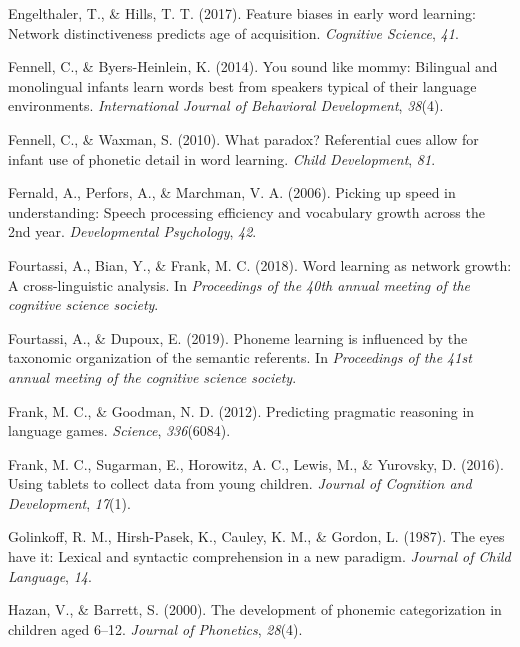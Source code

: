 \documentclass[english,,man]{apa6}
\begin{document}
\leavevmode\hypertarget{ref-engelthaler2017}{}%
Engelthaler, T., \& Hills, T. T. (2017). Feature biases in early word learning: Network distinctiveness predicts age of acquisition. \emph{Cognitive Science}, \emph{41}.

\leavevmode\hypertarget{ref-Fennell2014}{}%
Fennell, C., \& Byers-Heinlein, K. (2014). You sound like mommy: Bilingual and monolingual infants learn words best from speakers typical of their language environments. \emph{International Journal of Behavioral Development}, \emph{38}(4).

\leavevmode\hypertarget{ref-fennell2010}{}%
Fennell, C., \& Waxman, S. (2010). What paradox? Referential cues allow for infant use of phonetic detail in word learning. \emph{Child Development}, \emph{81}.

\leavevmode\hypertarget{ref-fernald2006}{}%
Fernald, A., Perfors, A., \& Marchman, V. A. (2006). Picking up speed in understanding: Speech processing efficiency and vocabulary growth across the 2nd year. \emph{Developmental Psychology}, \emph{42}.

\leavevmode\hypertarget{ref-fourtassi2018}{}%
Fourtassi, A., Bian, Y., \& Frank, M. C. (2018). Word learning as network growth: A cross-linguistic analysis. In \emph{Proceedings of the 40th annual meeting of the cognitive science society}.

\leavevmode\hypertarget{ref-fourtassi2019}{}%
Fourtassi, A., \& Dupoux, E. (2019). Phoneme learning is influenced by the taxonomic organization of the semantic referents. In \emph{Proceedings of the 41st annual meeting of the cognitive science society}.

\leavevmode\hypertarget{ref-frank2012}{}%
Frank, M. C., \& Goodman, N. D. (2012). Predicting pragmatic reasoning in language games. \emph{Science}, \emph{336}(6084).

\leavevmode\hypertarget{ref-frank2016}{}%
Frank, M. C., Sugarman, E., Horowitz, A. C., Lewis, M., \& Yurovsky, D. (2016). Using tablets to collect data from young children. \emph{Journal of Cognition and Development}, \emph{17}(1).

\leavevmode\hypertarget{ref-golinkoff1987}{}%
Golinkoff, R. M., Hirsh-Pasek, K., Cauley, K. M., \& Gordon, L. (1987). The eyes have it: Lexical and syntactic comprehension in a new paradigm. \emph{Journal of Child Language}, \emph{14}.

\leavevmode\hypertarget{ref-hazan2000}{}%
Hazan, V., \& Barrett, S. (2000). The development of phonemic categorization in children aged 6--12. \emph{Journal of Phonetics}, \emph{28}(4).
\end{document}
